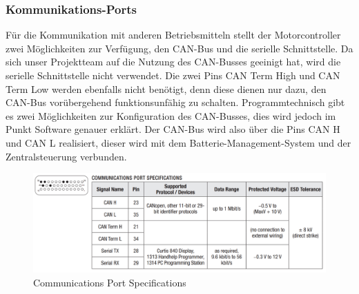 \subsubsection{Kommunikations-Ports}
\label{Kommunikations-Port}
Für die Kommunikation mit anderen Betriebsmitteln stellt der Motorcontroller zwei Möglichkeiten zur Verfügung, den CAN-Bus und die serielle Schnittstelle. Da sich unser Projektteam auf die Nutzung des CAN-Busses geeinigt hat, wird die serielle Schnittstelle nicht verwendet. Die zwei Pins \glqq CAN Term High\grqq{} und \glqq CAN Term Low\grqq{} werden ebenfalls nicht benötigt, denn diese dienen nur dazu, den CAN-Bus vorübergehend funktionsunfähig zu schalten. Programmtechnisch gibt es zwei Möglichkeiten zur Konfiguration des CAN-Busses, dies wird jedoch im Punkt Software genauer erklärt. Der CAN-Bus wird also über die Pins \glqq CAN H\grqq{} und \glqq CAN L\grqq{} realisiert, dieser wird mit dem Batterie-Management-System und der Zentralsteuerung verbunden.

\begin{figure}[H]
	\begin{center}
		\includegraphics[width=\textwidth]{figures/antrieb/Communications_Port_Specifications.png}
		\caption{Communications Port Specifications}
	\end{center}
\end{figure}



\newpage


